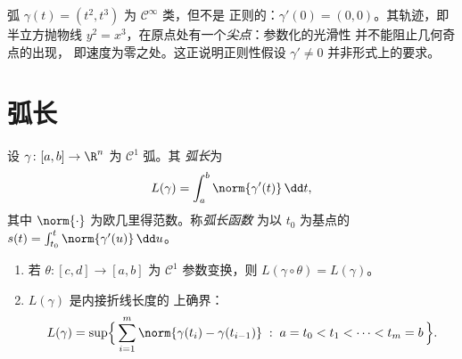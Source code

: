 \begin{example}\label{ex:b2:curves:cusp}
弧 $\gamma(t) = (t^2, t^3)$ 为 $\mathcal{C}^\infty$ 类，但不是
正则的：$\gamma'(0) = (0, 0)$。其轨迹，即半立方抛物线
$y^2 = x^3$，在原点处有一个\emph{尖点}：参数化的光滑性
并不能阻止几何奇点的出现，
即速度为零之处。这正说明正则性假设
$\gamma' \neq 0$ 并非形式上的要求。
\end{example}

\section{弧长}

\begin{definition}[弧长]\label{def:b2:curves:length}
设 $\gamma \colon [a, b] \to \R^n$ 为 $\mathcal{C}^1$ 弧。其
\emph{弧长}为
\[
L(\gamma) = \int_a^b \norm{\gamma'(t)}\, \dd t ,
\]
其中 $\norm{\cdot}$ 为欧几里得范数。称\emph{弧长函数}
为以 $t_0$ 为基点的 $s(t) = \int_{t_0}^t
\norm{\gamma'(u)}\,\dd u$。
\end{definition}

\begin{theorem}[弧长是几何量；折线
刻画]\label{thm:b2:curves:lengthinv}
\leavevmode
\begin{enumerate}
\item 若 $\theta \colon [c, d] \to [a, b]$ 为 $\mathcal{C}^1$
参数变换，则 $L(\gamma \circ \theta) = L(\gamma)$。
\item $L(\gamma)$ 是内接折线长度的
上确界：
\[
L(\gamma)
= \sup\Bigl\{\, \sum_{i=1}^{m} \norm{\gamma(t_i) -
\gamma(t_{i-1})} \;:\; a = t_0 < t_1 < \dots < t_m = b \,\Bigr\}.
\]
\end{enumerate}
\end{theorem}

